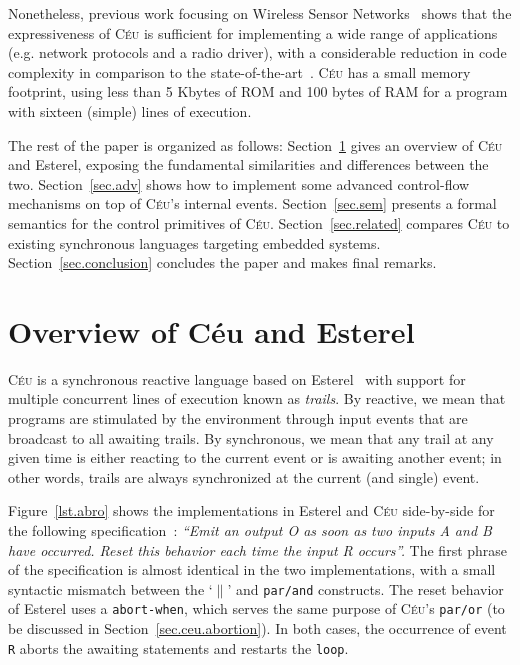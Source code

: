 \documentclass{acm_proc_article-sp}
\newcommand{\CEU}{\textsc{C\'{e}u}\xspace}
\newcommand{\code}[1] {{\small{\texttt{#1}}}}
\newcommand{\1}{\;}
\newcommand{\2}{\;\;}
\newcommand{\3}{\;\;\;}
\newcommand{\5}{\;\;\;\;\;}
\begin{document}
Nonetheless, previous work focusing on Wireless Sensor 
Networks~\cite{ceu.sensys} shows that the expressiveness of \CEU is sufficient 
for implementing a wide range of applications (e.g. network protocols and a 
radio driver), with a considerable reduction in code complexity in comparison 
to the state-of-the-art~\cite{wsn.nesc}.
%
\CEU has a small memory footprint, using less than 5 Kbytes of ROM and 100 
bytes of RAM for a program with sixteen (simple) lines of execution.

The rest of the paper is organized as follows:
Section~\ref{sec.ceu} gives an overview of \CEU and Esterel, exposing the 
fundamental similarities and differences between the two.
Section~\ref{sec.adv} shows how to implement some advanced control-flow 
mechanisms on top of \CEU's internal events.
Section~\ref{sec.sem} presents a formal semantics for the control primitives of 
\CEU.
Section~\ref{sec.related} compares \CEU to existing synchronous languages 
targeting embedded systems.
Section~\ref{sec.conclusion} concludes the paper and makes final remarks.

\newpage
\section{Overview of C\'eu and Esterel}
\label{sec.ceu}

\CEU is a synchronous reactive language based on Esterel~\cite{esterel.ieee91} 
with support for multiple concurrent lines of execution known as \emph{trails}.
By reactive, we mean that programs are stimulated by the environment through 
input events that are broadcast to all awaiting trails.
By synchronous, we mean that any trail at any given time is either reacting to 
the current event or is awaiting another event;
in other words, trails are always synchronized at the current (and single) 
event.

Figure~\ref{lst.abro} shows the implementations in Esterel and \CEU 
side-by-side for the following specification~\cite{esterel.primer}:
%
\emph{``Emit an output O as soon as two inputs A and B have occurred.
Reset this behavior each time the input R occurs''.}
%
The first phrase of the specification is almost identical in the two 
implementations, with a small syntactic mismatch between the `$\|$' and 
\code{par/and} constructs.
%
The reset behavior of Esterel uses a \code{abort-when}, which serves the same 
purpose of \CEU's \code{par/or} (to be discussed in 
Section~\ref{sec.ceu.abortion}).
In both cases, the occurrence of event \code{R} aborts the awaiting statements 
and restarts the \code{loop}.
\end{document}
